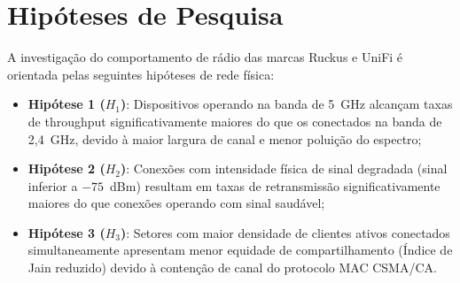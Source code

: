 \section{Hipóteses de Pesquisa}
\label{sec:metodologia_hipoteses}

A investigação do comportamento de rádio das marcas Ruckus e UniFi é orientada pelas seguintes hipóteses de rede física:
\begin{itemize}
	\item \textbf{Hipótese 1 ($H_1$)}: Dispositivos operando na banda de 5~GHz alcançam taxas de throughput significativamente maiores do que os conectados na banda de 2,4~GHz, devido à maior largura de canal e menor poluição do espectro;
	\item \textbf{Hipótese 2 ($H_2$)}: Conexões com intensidade física de sinal degradada (sinal inferior a $-75$~dBm) resultam em taxas de retransmissão significativamente maiores do que conexões operando com sinal saudável;
	\item \textbf{Hipótese 3 ($H_3$)}: Setores com maior densidade de clientes ativos conectados simultaneamente apresentam menor equidade de compartilhamento (Índice de Jain reduzido) devido à contenção de canal do protocolo MAC CSMA/CA.
\end{itemize}
